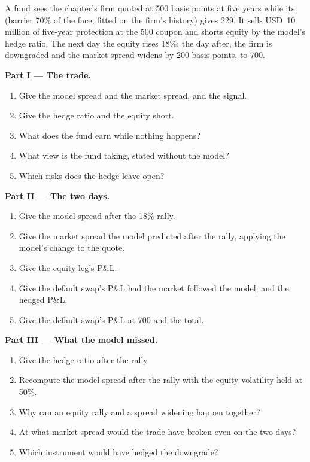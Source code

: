 \begin{problem}\label{pb:rc:structural-credit-models:1}
A fund sees the chapter's firm quoted at 500 basis points at five years while its
 (barrier 70\% of the face, fitted on the firm's history) gives 229. It
sells USD~10 million of five-year protection at the 500 coupon and shorts equity by the
model's hedge ratio. The next day the equity rises 18\%; the day after, the firm is
downgraded and the market spread widens by 200 basis points, to 700.

\medskip\noindent\textbf{Part I --- The trade.}
\begin{enumerate}
\item Give the model spread and the market spread, and the signal.
\item Give the hedge ratio and the equity short.
\item What does the fund earn while nothing happens?
\item What view is the fund taking, stated without the model?
\item Which risks does the hedge leave open?
\end{enumerate}

\medskip\noindent\textbf{Part II --- The two days.}
\begin{enumerate}[resume]
\item Give the model spread after the 18\% rally.
\item Give the market spread the model predicted after the rally, applying the model's
change to the quote.
\item Give the equity leg's P\&L.
\item Give the default swap's P\&L had the market followed the model, and the hedged P\&L.
\item Give the default swap's P\&L at 700 and the total.
\end{enumerate}

\medskip\noindent\textbf{Part III --- What the model missed.}
\begin{enumerate}[resume]
\item Give the hedge ratio after the rally.
\item Recompute the model spread after the rally with the equity volatility held at 50\%.
\item Why can an equity rally and a spread widening happen together?
\item At what market spread would the trade have broken even on the two days?
\item Which instrument would have hedged the downgrade?
\end{enumerate}


\end{problem}
